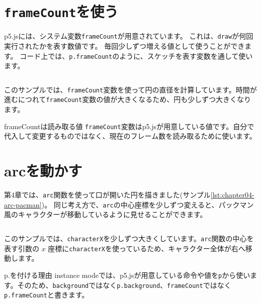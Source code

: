 \section{\texttt{frameCount}を使う}

p5.jsには、システム変数\texttt{frameCount}が用意されています。
これは、\texttt{draw}が何回実行されたかを表す数値です。
毎回少しずつ増える値として使うことができます。
コード上では、\texttt{p.frameCount}のように、スケッチを表す変数を通して使います。

\begin{listing}[htbp]
\inputminted{ts}{typescript-p5/listings/chapter05/frame-count.ts}
\caption{frameCountで大きさを変える（\texttt{chapter05/frame-count.ts}）}
\label{lst:chapter05-frame-count}
\end{listing}

このサンプルでは、\texttt{frameCount}変数を使って円の直径を計算しています。時間が進むにつれて\texttt{frameCount}変数の値が大きくなるため、円も少しずつ大きくなります。

\begin{notebox}{frameCountは読み取る値}
\texttt{frameCount}変数はp5.jsが用意している値です。自分で代入して変更するものではなく、現在のフレーム数を読み取るために使います。
\end{notebox}

\section{arcを動かす}

第4章では、\texttt{arc}関数を使って口が開いた円を描きました(サンプル\ref{lst:chapter04-arc-pacman})。
同じ考え方で、\texttt{arc}の中心座標を少しずつ変えると、パックマン風のキャラクターが移動しているように見せることができます。

\begin{listing}[htbp]
\inputminted[fontsize=\small]{ts}{typescript-p5/listings/chapter05/moving-pacman.ts}
\caption{arcで描いたキャラクターを動かす（\texttt{chapter05/moving-pacman.ts}）}
\label{lst:chapter05-moving-pacman}
\end{listing}

このサンプルでは、\texttt{characterX}を少しずつ大きくしています。\texttt{arc}関数の中心を表す引数の $x$ 座標に\texttt{characterX}を使っているため、キャラクター全体が右へ移動します。

\begin{pointbox}{p.を付ける理由}
instance modeでは、p5.jsが用意している命令や値を\texttt{p}から使います。そのため、\texttt{background}ではなく\texttt{p.background}、\texttt{frameCount}ではなく\texttt{p.frameCount}と書きます。
\end{pointbox}

